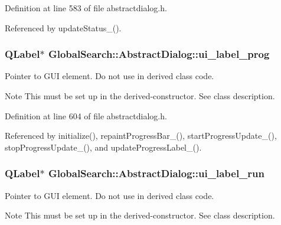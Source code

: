 Definition at line 583 of file abstractdialog.\-h.



Referenced by update\-Status\-\_\-().

\hypertarget{classGlobalSearch_1_1AbstractDialog_a21e1395aea6ac29a9c97b7ec2f54eb14}{
\subsubsection[{ui\-\_\-label\-\_\-prog}]{\setlength{\rightskip}{0pt plus 5cm}Q\-Label$\ast$ Global\-Search\-::\-Abstract\-Dialog\-::ui\-\_\-label\-\_\-prog\hspace{0.3cm}{\ttfamily [protected]}}}\label{classGlobalSearch_1_1AbstractDialog_a21e1395aea6ac29a9c97b7ec2f54eb14}
Pointer to G\-U\-I element. Do not use in derived class code. \begin{DoxyNote}{Note}
This must be set up in the derived-\/constructor. See class description. 
\end{DoxyNote}


Definition at line 604 of file abstractdialog.\-h.



Referenced by initialize(), repaint\-Progress\-Bar\-\_\-(), start\-Progress\-Update\-\_\-(), stop\-Progress\-Update\-\_\-(), and update\-Progress\-Label\-\_\-().

\hypertarget{classGlobalSearch_1_1AbstractDialog_af65c818f2bf846bcd76aa0e755e13453}{
\subsubsection[{ui\-\_\-label\-\_\-run}]{\setlength{\rightskip}{0pt plus 5cm}Q\-Label$\ast$ Global\-Search\-::\-Abstract\-Dialog\-::ui\-\_\-label\-\_\-run\hspace{0.3cm}{\ttfamily [protected]}}}\label{classGlobalSearch_1_1AbstractDialog_af65c818f2bf846bcd76aa0e755e13453}
Pointer to G\-U\-I element. Do not use in derived class code. \begin{DoxyNote}{Note}
This must be set up in the derived-\/constructor. See class description. 
\end{DoxyNote}


